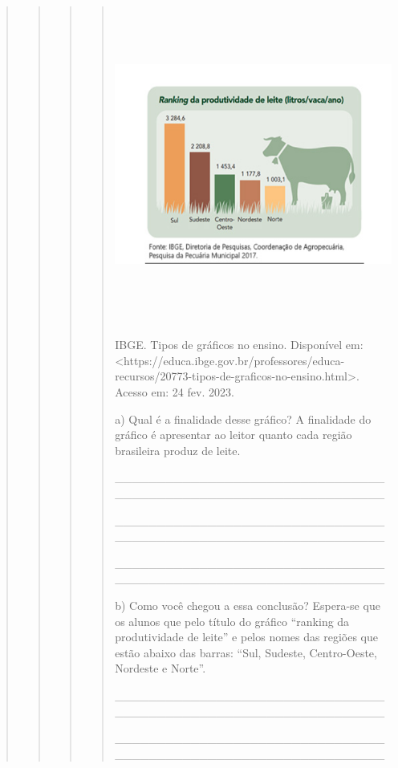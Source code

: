 \begin{quote}
\begin{quote}
\begin{quote}
\begin{quote}
\includegraphics[width=5.68530in,height=4.10069in]{media/image29.png}

IBGE. Tipos de gráficos no ensino. Disponível em:
\textless{}https://educa.ibge.gov.br/professores/educa-recursos/20773-tipos-de-graficos-no-ensino.html\textgreater{}.
Acesso em: 24 fev. 2023.

a) Qual é a finalidade desse gráfico? A finalidade do gráfico é
apresentar ao leitor quanto cada região brasileira produz de leite.

\_\_\_\_\_\_\_\_\_\_\_\_\_\_\_\_\_\_\_\_\_\_\_\_\_\_\_\_\_\_\_\_\_\_\_\_\_\_\_\_\_\_\_\_\_\_\_\_\_\_\_\_\_\_\_\_\_\_\_\_\_\_\_\_

\_\_\_\_\_\_\_\_\_\_\_\_\_\_\_\_\_\_\_\_\_\_\_\_\_\_\_\_\_\_\_\_\_\_\_\_\_\_\_\_\_\_\_\_\_\_\_\_\_\_\_\_\_\_\_\_\_\_\_\_\_\_\_\_

\_\_\_\_\_\_\_\_\_\_\_\_\_\_\_\_\_\_\_\_\_\_\_\_\_\_\_\_\_\_\_\_\_\_\_\_\_\_\_\_\_\_\_\_\_\_\_\_\_\_\_\_\_\_\_\_\_\_\_\_\_\_\_\_

b) Como você chegou a essa conclusão? Espera-se que os alunos que pelo
título do gráfico ``ranking da produtividade de leite'' e pelos nomes
das regiões que estão abaixo das barras: ``Sul, Sudeste, Centro-Oeste,
Nordeste e Norte''.

\_\_\_\_\_\_\_\_\_\_\_\_\_\_\_\_\_\_\_\_\_\_\_\_\_\_\_\_\_\_\_\_\_\_\_\_\_\_\_\_\_\_\_\_\_\_\_\_\_\_\_\_\_\_\_\_\_\_\_\_\_\_\_\_

\_\_\_\_\_\_\_\_\_\_\_\_\_\_\_\_\_\_\_\_\_\_\_\_\_\_\_\_\_\_\_\_\_\_\_\_\_\_\_\_\_\_\_\_\_\_\_\_\_\_\_\_\_\_\_\_\_\_\_\_\_\_\_\_


\end{quote}
\end{quote}
\end{quote}
\end{quote}
